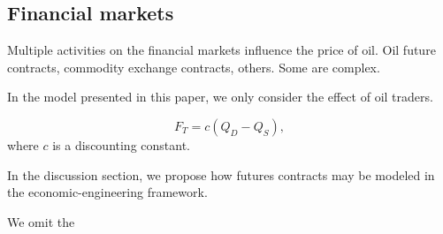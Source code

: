 \subsection{Financial markets}
Multiple activities on the financial markets influence the price of oil.
Oil future contracts, commodity exchange contracts, others.
Some are complex. 

In the model presented in this paper, we only consider the effect of oil traders.

\begin{equation}
    F_T = c (Q_D - Q_S),
\end{equation}
where $c$ is a discounting constant.

In the discussion section, we propose how futures contracts may be modeled in the economic-engineering framework.

We omit the 
